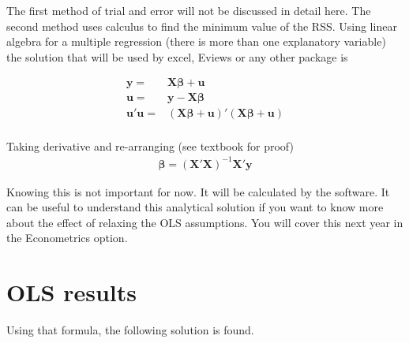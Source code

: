 \documentclass{article}\usepackage[]{graphicx}\usepackage[]{color}
\begin{document}
The first method of trial and error will not be discussed in detail here.  The second method uses calculus to find the minimum value of the RSS.  Using linear algebra for a multiple regression (there is more than one explanatory variable) the solution that will be used by excel, Eviews or any other package is

\begin{align*}
\mathbf{y} =& \mathbf{X \beta} + \mathbf{u}\\
\mathbf{u} =& \mathbf{y} - \mathbf{X\beta}\\
\mathbf{u}' \mathbf{u} =& (\mathbf{X \beta} + \mathbf{u})'(\mathbf{X \beta} + \mathbf{u})\\ 
\end{align*}

Taking derivative and re-arranging (see textbook for proof)
\begin{align*}
\mathbf{\beta} = \mathbf{(X'X)}^{-1}\mathbf{X'y}
\end{align*}

Knowing this is not important for now.  It will be calculated by the software.  It can be useful to understand this analytical solution if you want to know more about the effect of relaxing the OLS assumptions.  You will cover this next year in the Econometrics option. 

\section{OLS results}
Using that formula, the following solution is found. 
\end{document}
